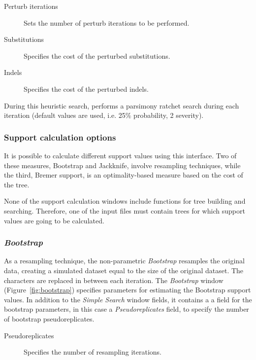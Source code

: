 {\begin{description}
    \item[Perturb iterations] Sets the number of perturb iterations to be performed.
    \item[Substitutions] Specifies the cost of the perturbed substitutions.
    \item[Indels] Specifies the cost of the perturbed indels.
\end{description}

During this heuristic search, \poy performs a parsimony ratchet search during each iteration (default values are used, i.e. 25\% probability, 2 severity).

\subsubsection{Support calculation options}

It is possible to calculate different support values using this interface.  Two of these measures, Bootstrap and Jackknife, involve resampling techniques, while the third, Bremer support, is an optimality-based measure based on the cost of the tree. 

None of the support calculation windows include functions for tree building and searching. Therefore, one of the input files must contain trees for which support values are going to be calculated.

\subsubsection*{\emph{Bootstrap}}

As a resampling technique, the non-parametric \emph{Bootstrap} resamples the original data, creating a simulated dataset equal to the size of the original dataset.  The characters are replaced in between each iteration. The \emph{Bootstrap} window (Figure~\ref{fig:bootstrap}) specifies parameters for estimating the Bootstrap support values. In addition to the \emph{Simple Search} window fields, it contains a a field for the bootstrap parameters, in this case a \emph{Pseudoreplicates} field, to specify the number of bootstrap pseudoreplicates.

\begin{description}
    \item[Pseudoreplicates] Specifies the number of resampling iterations.
\end{description}

}
